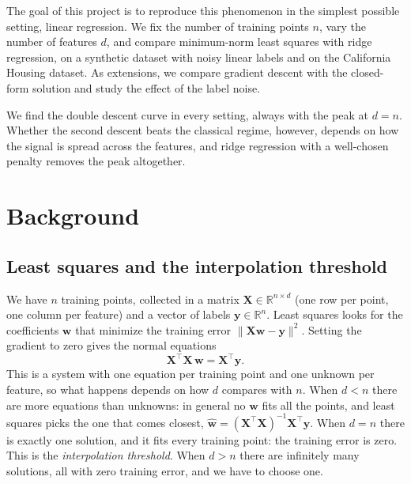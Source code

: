 \documentclass[11pt,a4paper]{article}
\begin{document}
The goal of this project is to reproduce this phenomenon in the simplest
possible setting, linear regression. We fix the number of training points
$n$, vary the number of features $d$, and compare minimum-norm least squares
with ridge regression, on a synthetic dataset with noisy linear labels and
on the California Housing dataset. As extensions, we compare gradient
descent with the closed-form solution and study the effect of the label
noise.

We find the double descent curve in every setting, always with the peak at
$d = n$. Whether the second descent beats the classical regime, however,
depends on how the signal is spread across the features, and ridge
regression with a well-chosen penalty removes the peak altogether.

\section{Background}
\label{sec:background}

\subsection{Least squares and the interpolation threshold}
We have $n$ training points, collected in a matrix
$\mathbf{X} \in \mathbb{R}^{n \times d}$ (one row per point, one column per
feature) and a vector of labels $\mathbf{y} \in \mathbb{R}^n$. Least squares
looks for the coefficients $\mathbf{w}$ that minimize the training error
$\|\mathbf{X}\mathbf{w} - \mathbf{y}\|^2$. Setting the gradient to zero
gives the normal equations
\begin{equation}
  \mathbf{X}^\top \mathbf{X} \, \mathbf{w} = \mathbf{X}^\top \mathbf{y} .
\end{equation}
This is a system with one equation per training point and one unknown per
feature, so what happens depends on how $d$ compares with $n$. When
$d < n$ there are more equations than unknowns: in general no $\mathbf{w}$
fits all the points, and least squares picks the one that comes closest,
$\hat{\mathbf{w}} = (\mathbf{X}^\top \mathbf{X})^{-1} \mathbf{X}^\top \mathbf{y}$.
When $d = n$ there is exactly one solution, and it fits every training
point: the training error is zero. This is the \emph{interpolation
threshold}. When $d > n$ there are infinitely many solutions, all with zero
training error, and we have to choose one.
\end{document}
